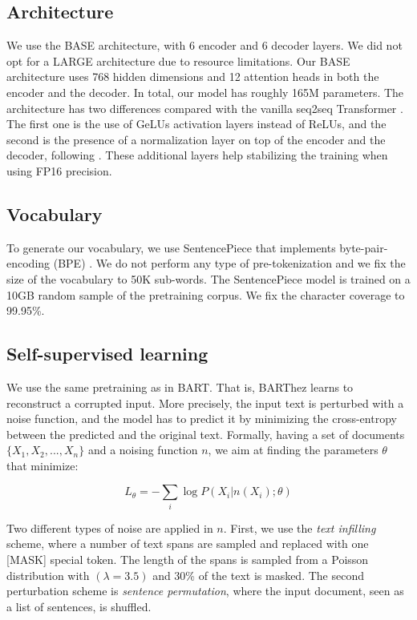 \documentclass[11pt,a4paper]{article}
\begin{document}
\subsection{Architecture}
We use the BASE architecture, with 6 encoder and 6 decoder layers.
We did not opt for a LARGE architecture due to resource limitations.
Our BASE architecture uses 768 hidden dimensions and 12 attention heads in both the encoder and the decoder.
In total, our model has roughly 165M parameters.
The architecture has two differences compared with the vanilla seq2seq Transformer \citep{vaswani2017attention}.
The first one is the use of GeLUs activation layers instead of ReLUs, and the second is the presence of a normalization layer on top of the encoder and the decoder, following \citet{liu2020multilingual}.
These additional layers help stabilizing the training when using FP16 precision.

\subsection{Vocabulary}
To generate our vocabulary, we use SentencePiece \citep{kudo2018sentencepiece} that implements byte-pair-encoding (BPE) \citep{sennrich2015neural}.
We do not perform any type of pre-tokenization and we fix the size of the vocabulary to 50K sub-words. The SentencePiece model is trained on a 10GB random sample of the pretraining corpus.
We fix the character coverage to 99.95\%. 

\subsection{Self-supervised learning} \label{subsec:pretraining}
We use the same pretraining as in BART.
That is, BARThez learns to reconstruct a corrupted input.
More precisely, the input text is perturbed with a noise function, and the model has to predict it by minimizing the cross-entropy between the predicted and the original text.
Formally, having a set of documents $\{X_1, X_2, ... , X_n\}$ and a noising function $n$, we aim at finding the parameters $\theta$ that minimize:

$$L_{\theta}=-\sum_i\log P(X_i|n(X_i); \theta)$$

Two different types of noise are applied in $n$.
First, we use the \textit{text infilling} scheme, where a number of text spans are sampled and replaced with one [MASK] special token.
The length of the spans is sampled from a Poisson distribution with $(\lambda=3.5)$ and 30\% of the text is masked.
The second perturbation scheme is \textit{sentence permutation}, where the input document, seen as a list of sentences, is shuffled.
\end{document}
